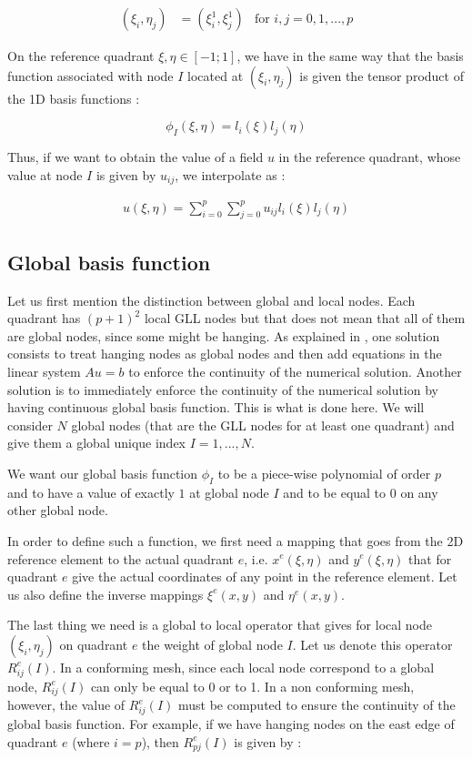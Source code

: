 \begin{align*}
(\xi_i, \eta_j) &= (\xi^1_i,\xi^1_j) &\text{for $i,j=0,1,...,p$}
\end{align*}

On the reference quadrant $\xi, \eta \in [-1;1]$, we have in the same way that the basis function associated with node $I$ located at $(\xi_i,\eta_j)$ is given the tensor product of the 1D basis functions : 

$$\phi_I(\xi,\eta) = l_i(\xi)l_j(\eta)$$

Thus, if we want to obtain the value of a field $u$ in the reference quadrant, whose value at node $I$ is given by $u_{ij}$, we interpolate as : 

\begin{align*}
u(\xi,\eta) = \sum_{i=0}^p\sum_{j=0}^p u_{ij}l_i(\xi)l_j(\eta)
\end{align*}

\subsection{Global basis function}

Let us first mention the distinction between global and local nodes. Each quadrant has $(p+1)^2$ local GLL nodes but that does not mean that all of them are global nodes, since some might be hanging. As explained in \cite{hang_treat}, one solution consists to treat hanging nodes as global nodes and then add equations in the linear system $Au=b$ to enforce the continuity of the numerical solution. Another solution is to immediately enforce the continuity of the numerical solution by having continuous global basis function. This is what is done here. We will consider $N$ global nodes (that are the GLL nodes for at least one quadrant) and give them a global unique index $I = 1,...,N$. 

We want our global basis function $\phi_I$ to be a piece-wise polynomial of order $p$ and to have a value of exactly $1$ at global node $I$ and to be equal to $0$ on any other global node. 

In order to define such a function, we first need a mapping that goes from the 2D reference element to the actual quadrant $e$, i.e. $x^e(\xi,\eta)$ and $y^e(\xi,\eta)$ that for quadrant $e$ give the actual coordinates of any point in the reference element. Let us also define the inverse mappings $\xi^e(x,y)$ and $\eta^e(x,y)$. 

The last thing we need is a global to local operator that gives for local node $(\xi_i,\eta_j)$ on quadrant $e$ the weight of global node $I$. Let us denote this operator $R^e_{ij}(I)$. In a conforming mesh, since each local node correspond to a global node, $R^e_{ij}(I)$ can only be equal to 0 or to 1. In a non conforming mesh, however, the value of $R^e_{ij}(I)$ must be computed to ensure the continuity of the global basis function. For example, if we have hanging nodes on the east edge of quadrant $e$ (where $i=p$), then $R^e_{pj}(I)$ is given by : 

